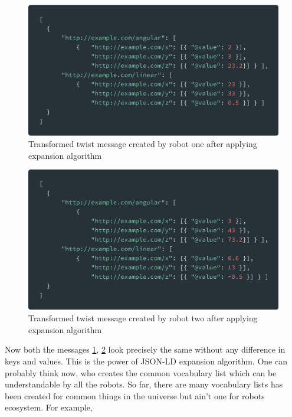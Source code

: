 		\begin{figure}[!htbp] 
			\begin{center}
				\includegraphics[scale=0.1]{./images/png/jsonld/5}	
				\caption{Transformed twist message created by robot one after applying expansion algorithm}	
				\label{fig:jsonld_5}	
			\end{center}
		\end{figure}
	
		\begin{figure}[!htbp] 
			\begin{center}
				\includegraphics[scale=0.1]{./images/png/jsonld/6}	
				\caption{Transformed twist message created by robot two after applying expansion algorithm}	
				\label{fig:jsonld_6}	
			\end{center}
		\end{figure}
	
	Now both the messages \ref{fig:jsonld_5}, \ref{fig:jsonld_6} look precisely the same without any difference in keys and values. This is the power of JSON-LD expansion algorithm. One can probably think now, who creates the common vocabulary list which can be understandable by all the robots. So far, there are many vocabulary lists has been created for common things in the universe but ain't one for robots ecosystem. For example,
	
